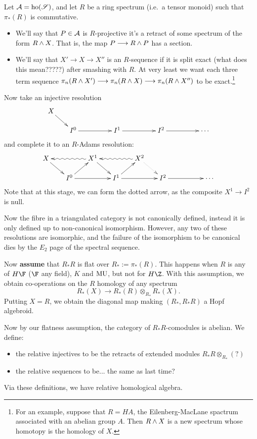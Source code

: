 \documentclass[11pt]{article}
\begin{document}
Let $\mathcal{A}=\textup{ho}(\mathscr{S})$, and let $R$ be a ring spectrum (i.e.\ a tensor monoid) such that $\pi_{*}(R)$ is commutative. 
\begin{itemize}\squishlist
\item We'll say that $P\in\mathcal{A}$ is $R$-projective \Iff it's a retract of some spectrum of the form $R\wedge X$. That is, \Iff the map $P\longrightarrow R\wedge P$ has a section.
\item We'll say that $X'\to X\to X''$ is an $R$-sequence if it is split exact (what does this mean?????) after smashing with $R$. At very least we want each three term sequence $\pi_{n}(R\wedge X')\longrightarrow\pi_{n}(R\wedge X)\longrightarrow\pi_{n}(R\wedge X'')$ to be exact.\footnote{For an example, suppose that $R=HA$, the Eilenberg-MacLane spactrum associated with an abelian group $A$. Then $R\wedge X$ is a new spectrum whose homotopy is the homology of $X$.}
\end{itemize}
Now take an injective resolution
\[\xymatrix@R=.5cm@C=.5cm@!C{
X\ar[dr]&%
&%
&%
&%
&%
&%
&%
\\%
&%
I^0\ar[rr]&%
&%
I^1\ar[rr]&%
&%
I^2\ar[rr]&%
&%
\cdots%
}\]
and complete it to an $R$-Adams resolution:
\[\xymatrix@R=.5cm@C=.5cm@!C{
X\ar[dr]&%
&%
X^1\ar@{~>}[ll]\ar[dr]&%
&%
X^2\ar@{~>}[ll]\ar@{..>}[dr]&%
&%
&%
\\%
&%
\ar[ur]I^0\ar[rr]&%
&%
\ar[ur]I^1\ar[rr]&%
&%
I^2\ar[rr]&%
&%
\cdots%
}\]
Note that at this stage, we can form the dotted arrow, as the composite $X^1\to I^2$ is null.

Now the fibre in a triangulated category is not canonically defined, instead it is only defined up to non-canonical isomorphism. However, any two of these resolutions are isomorphic, and the failure of the isomorphism to be canonical dies by the $E_2$ page of the spectral sequence.


Now \textbf{assume} that $R_*R$ is flat over $R_*:=\pi_{*}(R)$. This happens when $R$ is any of $H\F$ ($\F$ any field), $K$ and $\textup{MU}$, but not for $H\Z$. With this assumption, we obtain co-operations on the $R$ homology of any spectrum
\[R_*(X)\to R_*(R)\otimes_{R_*}R_*(X).\]
Putting $X=R$, we obtain the diagonal map making $(R_*,R_*R)$ a Hopf algebroid.

Now by our flatness assumption, the category of $R_*R$-comodules is abelian. We define:
\begin{itemize}\squishlist
\item the relative injectives to be the retracts of extended modules $R_*R\otimes_{R_*}(?)$
\item the relative sequences to be... the same as last time?
\end{itemize}
Via these definitions, we have relative homological algebra.
\end{document}
